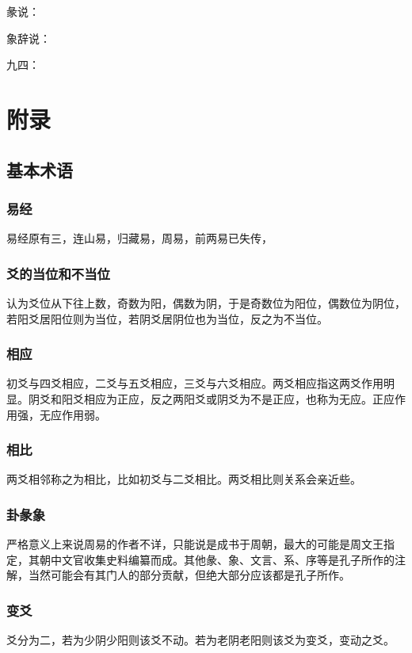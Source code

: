 \documentclass[12pt,oneside]{book}
\begin{document}
彖说：

象辞说：

九四：







\part{附录}
\chapter{基本术语}
\section{易经}
易经原有三，连山易，归藏易，周易，前两易已失传，

\section{爻的当位和不当位}
认为爻位从下往上数，奇数为阳，偶数为阴，于是奇数位为阳位，偶数位为阴位，若阳爻居阳位则为当位，若阴爻居阴位也为当位，反之为不当位。

\section{相应}
初爻与四爻相应，二爻与五爻相应，三爻与六爻相应。两爻相应指这两爻作用明显。阴爻和阳爻相应为正应，反之两阳爻或阴爻为不是正应，也称为无应。正应作用强，无应作用弱。

\section{相比}
两爻相邻称之为相比，比如初爻与二爻相比。两爻相比则关系会亲近些。

\section{卦彖象}
严格意义上来说周易的作者不详，只能说是成书于周朝，最大的可能是周文王指定，其朝中文官收集史料编纂而成。其他彖、象、文言、系、序等是孔子所作的注解，当然可能会有其门人的部分贡献，但绝大部分应该都是孔子所作。

\section{变爻}
爻分为二，若为少阴少阳则该爻不动。若为老阴老阳则该爻为变爻，变动之爻。
\end{document}
